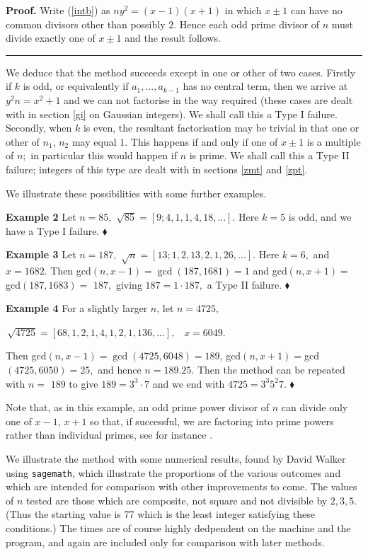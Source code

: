 \documentclass[12pt]{article}
\newenvironment{proof}[1][Proof]{\textbf{#1.} }{\ \rule{0.5em}{0.5em}}
\begin{document}
\begin{proof}
Write (\ref{intb}) as $ny^{2}=\left( x-1\right) \left( x+1\right) $ in which 
$x\pm 1$ can have no common divisors other than possibly $2$. Hence each odd
prime divisor of $n$ must divide exactly one of $x\pm 1$ and the result
follows.
\end{proof}

We deduce that the method succeeds except in one or other of two cases.
Firstly if $k$ is odd, or equivalently if $a_{1},...,a_{k-1}$ has no central
term, then we arrive at $y^{2}n=x^{2}+1$ and we can not factorise in the way
required (these cases are dealt with in section \ref{gi} on Gaussian
integers). We shall call this a Type I failure. Secondly, when $k$ is even,
the resultant factorisation may be trivial in that one or other of $%
n_{1},\,n_{2}$ may equal $1.$ This happens if and only if one of $x\pm 1$ is
a multiple of $n;$ in particular this would happen if $n$ is prime. We shall
call this a Type II failure; integers of this type are dealt with in
sections \ref{zmt} and \ref{zpt}.

We illustrate these possibilities with some further examples.

\textbf{Example 2 }Let $n=85,$ $\sqrt{85}=\left[ 9;4,1,1,4,18,...\right] .$
Here $k=5$ is odd, and we have a Type I failure. $\blacklozenge $

\textbf{Example 3 }Let $n=187,$ $\sqrt{n}=\left[ 13;1,2,13,2,1,26,...\right]
.$ Here $k=6,$ and $x=1682.$ Then gcd$\left( n,x-1\right) =\gcd \left(
187,1681\right) =1$ and gcd$\left( n,x+1\right) =$gcd$\left( 187,1683\right)
=$ $187,$ giving $187=1\cdot 187,$ a Type II failure. $\blacklozenge $

\textbf{Example 4} For a slightly larger $n$, let $n=4725,$

$\,\sqrt{4725}=\left[ 68,1,2,1,4,1,2,1,136,...\right] ,$ \ $x=6049.\ $

Then gcd$\left( n,x-1\right) =\gcd \left( 4725,6048\right) =189$, gcd$\left(
n,x+1\right) =$gcd$\left( 4725,6050\right) =25,$ and hence $n=189.25.$ Then
the method can be repeated with $n=$ $189$ to give $189=3^{3}\cdot 7$ and we
end with $4725=3^{3}5^{2}7.$ $\blacklozenge $

Note that, as in this example, an odd prime power divisor of $n$ can divide
only one of $x-1$, $x+1$ so that, if successful, we are factoring into prime
powers rather than individual primes, see for instance \cite[1.7.3]%
{Cohen:1993:EF}.

We illustrate the method with some numerical results, found by David Walker
using \texttt{sagemath}, which illustrate the proportions of the various
outcomes and which are intended for comparison with other improvements to
come. The values of $n$ tested are those which are composite, not square and
not divisible by $2,3,5.$ (Thus the starting value is 77 which is the least
integer satisfying these conditions.) The times are of course highly
dedpendent on the machine and the program, and again are included only for
comparison with later methods.
\end{document}
